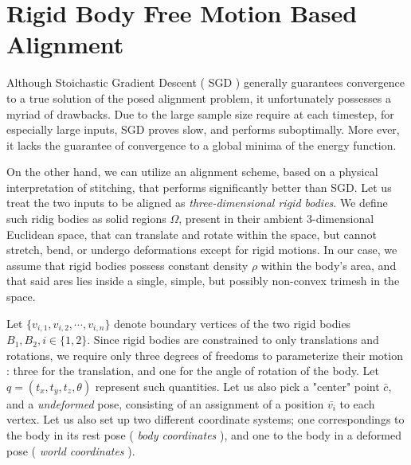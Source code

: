 \documentclass{article}
\begin{document}


\section{Rigid Body Free Motion Based Alignment}

\indent Although Stoichastic Gradient Descent ( SGD ) generally guarantees convergence to a true solution of the posed alignment problem, it unfortunately possesses a myriad of drawbacks. Due to the large sample size require at each timestep,  for especially large inputs, SGD proves slow, and performs suboptimally. More ever, it lacks the guarantee of convergence to a global minima of the energy function.
	
\indent On the other hand, we can utilize an alignment scheme, based on a physical interpretation of stitching, that performs significantly better than SGD. Let us treat the two inputs to be aligned as \textit{three-dimensional rigid bodies}. We define such ridig bodies as solid regions $\Omega$, present in their ambient 3-dimensional Euclidean space, that can translate and rotate within the space, but cannot stretch, bend, or undergo deformations except for rigid motions. In our case, we assume that rigid bodies possess constant density $\rho$ within the body's area, and that said ares lies inside a single, simple, but possibly non-convex trimesh in the space.  

\indent Let $\{ v_{i,1},v_{i,2},\cdots,v_{i,n} \}$ denote boundary vertices of the two rigid bodies $B_1,B_2, i \in \{ 1,2 \}$. Since rigid bodies are constrained to only translations and rotations, we require only three degrees of freedoms to parameterize their motion : three for the translation, and one for the angle of rotation of the body. Let $q = (t_x,t_y,t_z,\theta)$ represent such quantities. Let us also pick a "center" point $\bar{c}$, and a \textit{undeformed} pose, consisting of an assignment of a position $\bar{v_i}$ to each vertex. Let us also set up two different coordinate systems; one correspondings to the body in its rest pose ( \textit{body coordinates} ), and one to the body in a deformed pose ( \textit{world coordinates} ).
\end{document}
